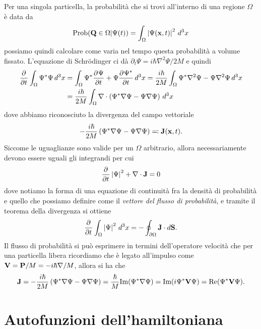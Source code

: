 Per una singola particella, la probabilità che si trovi all'interno di una regione $ \Omega $ è data da 
\begin{align*}
  \operatorname{\textnormal{Prob}}( \mathbf{Q} \in \Omega | \Psi(t)) = \int_\Omega \left|{\Psi(\mathbf{x}, t)}\right|^2 \, d^3x
\end{align*}
possiamo quindi calcolare come varia nel tempo questa probabilità a volume fissato. L'equazione di Schrödinger ci dà 
$ \partial_t \Psi = i \hbar \nabla^2 \Psi /2M $ e quindi 
\begin{align*}
  \frac{\partial^{} {}}{\partial {t}^{}} \int_\Omega \Psi^* \Psi \, d^3x &= \int_\Omega \Psi^* \frac{\partial^{} {\Psi}}{\partial {t}^{}} + \Psi \frac{\partial^{} {\Psi^*}}{\partial {t}^{}} \, d^3x 
  = \frac{i\hbar}{2M} \int_\Omega \Psi^* \nabla^2 \Psi - \Psi \nabla^2 \Psi \, d^3x 
  \\
  &= \frac{i\hbar}{2M} \int_\Omega \nabla \cdot \left( \Psi^* \nabla \Psi - \Psi \nabla \Psi \right) \, d^3x 
\end{align*}
dove abbiamo riconosciuto la divergenza del campo vettoriale 
\begin{align*}
  -\frac{i\hbar}{2M} \left( \Psi^* \nabla \Psi - \Psi \nabla \Psi \right) \eqcolon \mathbf{J}(\mathbf{x}, t).
\end{align*}
Siccome le uguaglianze sono valide per un $ \Omega $ arbitrario, allora necessariamente devono essere uguali gli integrandi per cui 
\begin{align*}
  \frac{\partial^{} {}}{\partial {t}^{}} \left|{\Psi}\right|^2 + \nabla\cdot\mathbf{ J } = 0
\end{align*}
dove notiamo la forma di una equazione di continuità fra la densità di probabilità e quello che possiamo definire come il 
\textit{vettore del flusso di probabilità}, e tramite il teorema della divergenza si ottiene 
\begin{align*}
  \frac{\partial^{} {}}{\partial {t}^{}} \int_\Omega \left|{\Psi}\right|^2 \, d^3x = - \oint_{\partial \Omega} \mathbf{J} \cdot d\mathbf{S}.
\end{align*}
Il flusso di probabilità si può esprimere in termini dell'operatore velocità che per una particella libera ricordiamo che è legato all'impulso come 
$ \mathbf{V} = \mathbf{P}/M  = - i \hbar \nabla/M $, allora si ha che 
\begin{align*}
  \mathbf{J} = -\frac{i\hbar}{2M} \left( \Psi^* \nabla \Psi - \Psi \nabla \Psi \right) = \frac\hbar{M}\text{Im}(\Psi^* \nabla \Psi) 
  = \text{Im}( i \Psi^* \mathbf{V} \Psi) = \text{Re}(\Psi^* \mathbf{V} \Psi).
\end{align*}


\section{Autofunzioni dell'hamiltoniana}

